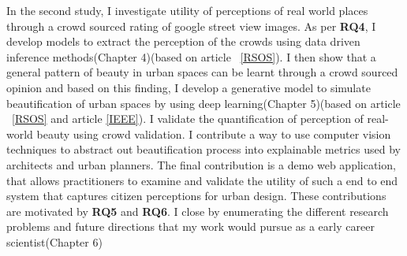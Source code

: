 In the second study, I investigate utility of perceptions of real world places through a crowd sourced rating of google street view images. As per \textbf{RQ4}, I develop models to extract the perception of the crowds using data driven inference methods(Chapter 4)(based on article ~\ref{RSOS}). 
I then show that a general pattern of beauty in urban spaces can be learnt through a crowd sourced opinion and based on this finding, I develop a generative model to simulate beautification of urban spaces by using deep learning(Chapter 5)(based on article ~\ref{RSOS} and article \ref{IEEE}). I validate the quantification of perception of real-world beauty using crowd validation. I contribute a way to use computer vision techniques to abstract out beautification process into explainable metrics used by architects and urban planners. The final contribution is a demo web application, that allows practitioners to examine and validate the utility of such a end to end system that captures citizen perceptions for urban design. These contributions are motivated by \textbf{RQ5} and \textbf{RQ6}. 
I close by enumerating the different research problems and future directions that my work would pursue as a early career scientist(Chapter 6)








